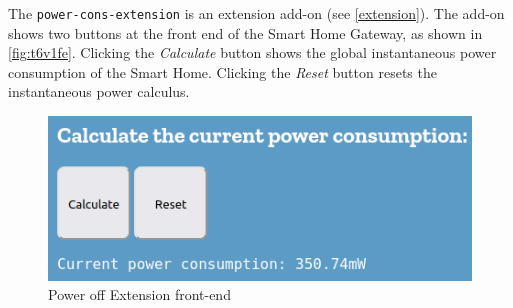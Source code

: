 The \texttt{power-cons-extension} is an extension add-on (see \autoref{extension}). The add-on shows two buttons at the front end of the Smart Home Gateway, as shown in \autoref{fig:t6v1fe}. Clicking the \textit{Calculate} button shows the global instantaneous power consumption of the Smart Home. Clicking the \textit{Reset} button resets the instantaneous power calculus.

\begin{figure}[H]
    \centering
    \includegraphics[scale=0.75]{images/addons/power-cons.png}
    \caption{Power off Extension front-end}
    \label{fig:t6v1fe}
\end{figure}


  
            
  
  

